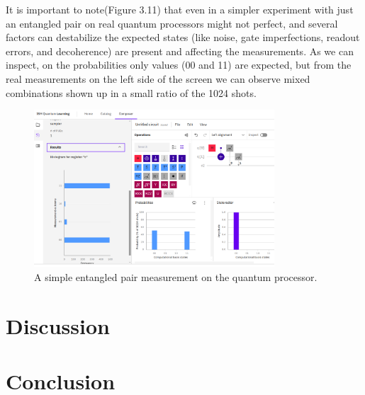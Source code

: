 \documentclass[12pt,a4paper] {report}
\begin{document}
		It is important to note(Figure 3.11) that even in a simpler experiment with just an entangled pair on real 
		quantum processors might not perfect, and several factors can destabilize the expected states 
		(like noise, gate imperfections, readout errors, and decoherence) are present and affecting the measurements.
		As we can inspect, on the probabilities only values (00 and 11) are expected, but from the real measurements 
		on the left side of the screen we can observe mixed combinations shown up in a small ratio of the 1024 shots.
		
		\begin{figure}[h!]
			\centering
			\includegraphics[width=0.8\textwidth]{ibmq/e.png}
			\caption{A simple entangled pair measurement on the quantum processor.}
			\label{fig:}
		\end{figure}		
		

	\chapter{Discussion}

	\chapter{Conclusion}
\end{document}
